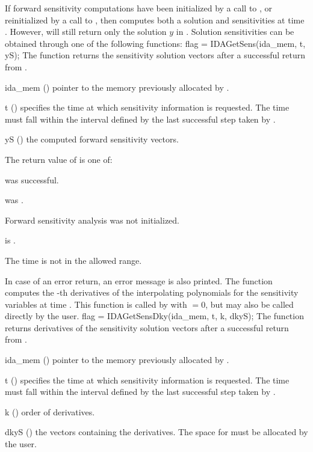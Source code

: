 If forward sensitivity computations have been initialized by a call to ,
or reinitialized by a call to , then {\idas} computes both a solution
and sensitivities at time . However,  will still return only the solution
$y$ in . Solution sensitivities can be obtained through one of the following functions:
{
  flag = IDAGetSens(ida\_mem, t, yS);
}
{
  The function  returns the sensitivity solution vectors after a
  successful return from .
}
{
  \begin{args}
  \item[ida\_mem] ()
    pointer to the memory previously allocated by .
  \item[t] ()
    specifies the time at which sensitivity information is 
    requested. The time  must fall within the interval defined by the last 
    successful step taken by {\idas}.
  \item[yS] ()
    the computed forward sensitivity vectors.
  \end{args}
}
{
  The return value  of  is one of:
  \begin{args}
  \item[\Id{IDA\_SUCCESS}] 
     was successful.
  \item[\Id{IDA\_MEM\_NULL}] 
     was .
  \item[\Id{IDA\_NO\_SENS}] 
    Forward sensitivity analysis was not initialized.
  \item[\Id{IDA\_BAD\_DKY}] 
     is .
  \item[\Id{IDA\_BAD\_T}]
    The time  is not in the allowed range.
  \end{args}
}
{
  In case of an error return, an error message is also printed.  
}
The function  computes the -th derivatives of the interpolating 
polynomials for the sensitivity variables at time .
This function is called by  with  $= 0$, but may also be called 
directly by the user.
{
  flag = IDAGetSensDky(ida\_mem, t, k, dkyS);
}
{
  The function  returns derivatives of the sensitivity solution 
  vectors after a successful return from .
}
{
  \begin{args}
  \item[ida\_mem] ()
    pointer to the memory previously allocated by .
  \item[t] ()
    specifies the time at which sensitivity information is 
    requested. The time  must fall within the interval defined by the last 
    successful step taken by {\idas}.
  \item[k] () order of derivatives.
  \item[dkyS] ()
    the vectors containing the derivatives. The space for  must be allocated by 
    the user. 
  \end{args}
}
